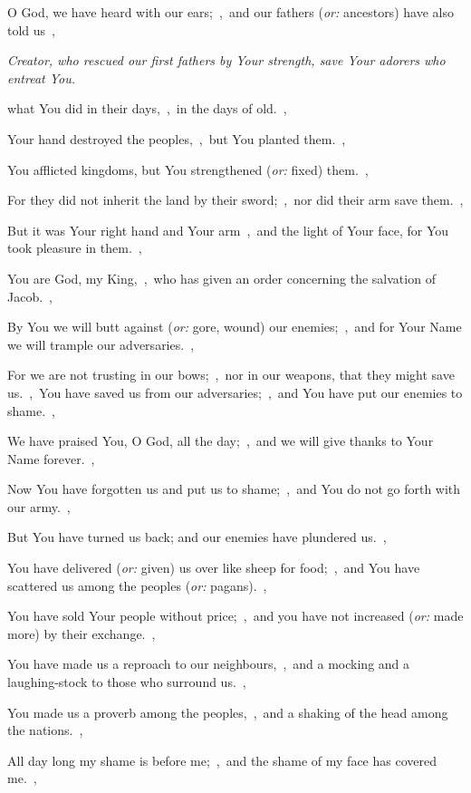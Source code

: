 \documentclass[12pt,twoside,a5paper]{article}
\newcommand{\qanona}[1]{{\liturgicalhint{Qanona.} \emph{#1}}}
\newcommand{\translationoption}[1]{\emph{or:} #1}
\begin{document}
\begin{normalparskip}
  O God, we have heard with our ears;~\sep\ and our fathers (\translationoption{ancestors}) have also told us~\sep

  \qanona{Creator, who rescued our first fathers by Your strength, save Your adorers who entreat You.}

  what You did in their days,~\sep\ in the days of old.~\sep

  Your hand destroyed the peoples,~\sep\ but You planted them.~\sep

  You afflicted kingdoms, but You strengthened (\translationoption{fixed}) them.~\sep

  For they did not inherit the land by their sword;~\sep\ nor did their arm save them.~\sep

  But it was Your right hand and Your arm~\sep\ and the light of Your face, for You took pleasure in them.~\sep

  You are God, my King,~\sep\ who has given an order concerning the salvation of Jacob.~\sep

  By You we will butt against (\translationoption{gore, wound}) our enemies;~\sep\ and for Your Name we will trample our adversaries.~\sep

  For we are not trusting in our bows;~\sep\ nor in our weapons, that they might save us.~\sep\ You have saved us from our adversaries;~\sep\ and You have put our enemies to shame.~\sep

  We have praised You, O God, all the day;~\sep\ and we will give thanks to Your Name forever.~\sep

  Now You have forgotten us and put us to shame;~\sep\ and You do not go forth with our army.~\sep

  But You have turned us back; and our enemies have plundered us.~\sep

  You have delivered (\translationoption{given}) us over like sheep for food;~\sep\ and You have scattered us among the peoples (\translationoption{pagans}).~\sep

  You have sold Your people without price;~\sep\ and you have not increased (\translationoption{made more}) by their exchange.~\sep

  You have made us a reproach to our neighbours,~\sep\ and a mocking and a laughing-stock to those who surround us.~\sep

  You made us a proverb among the peoples,~\sep\ and a shaking of the head among the nations.~\sep

  All day long my shame is before me;~\sep\ and the shame of my face has covered me.~\sep


\end{normalparskip}
\end{document}
